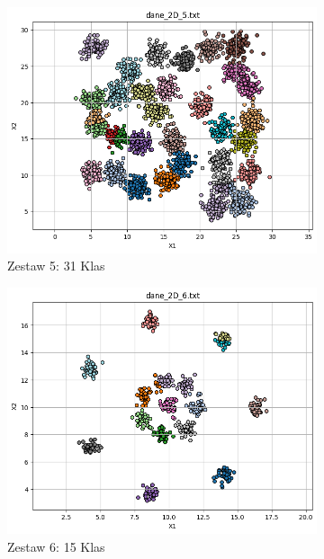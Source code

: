 \documentclass[polish,12pt,a4paper]{extarticle}
\begin{document}
\begin{figure}[h!]
\begin{subfigure}[b]{0.30\textwidth}
        \includegraphics[width=\linewidth]{img/kmeans2D/data5.png}
        \captionsetup{labelformat=empty}
        \caption{Zestaw 5: 31 Klas}
    \end{subfigure}
    \hfill
    \begin{subfigure}[b]{0.30\textwidth}
        \includegraphics[width=\linewidth]{img/kmeans2D/data6.png}
        \captionsetup{labelformat=empty}
        \caption{Zestaw 6: 15 Klas}
    \end{subfigure}
    \hfill
    \vspace{}
    \begin{subfigure}[b]{0.30\textwidth}

\end{subfigure}
\end{figure}
\end{document}
